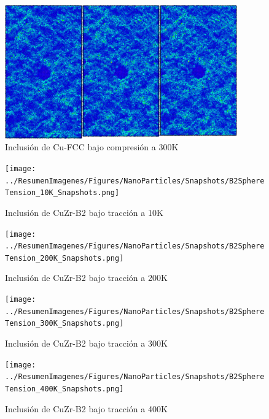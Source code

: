 \begin{figure}[htp]
\centering
\includegraphics[width=10cm]{../ResumenImagenes/Figures/NanoParticles/Snapshots/cuSphereCompression_300K_Snapshots.png}
\caption[Inclusión de Cu-FCC bajo compresión a 300K]{Inclusión de Cu-FCC bajo compresión a 300K}
\label{C4:fg:snapshot_comp_FCC_300K}
\end{figure}

\begin{figure}[htp]
\centering
\texttt{[image: ../ResumenImagenes/Figures/NanoParticles/Snapshots/B2SphereTension\_10K\_Snapshots.png]}
\caption[Inclusión de CuZr-B2 bajo tracción a 10K]{Inclusión de CuZr-B2 bajo tracción a 10K}
\label{C4:fg:snapshot_ten_B2_10K}
\end{figure}

\begin{figure}[htp]
\centering
\texttt{[image: ../ResumenImagenes/Figures/NanoParticles/Snapshots/B2SphereTension\_200K\_Snapshots.png]}
\caption[Inclusión de CuZr-B2 bajo tracción a 200K]{Inclusión de CuZr-B2 bajo tracción a 200K}
\label{C4:fg:snapshot_ten_B2_200K}
\end{figure}

\begin{figure}[htp]
\centering
\texttt{[image: ../ResumenImagenes/Figures/NanoParticles/Snapshots/B2SphereTension\_300K\_Snapshots.png]}
\caption[Inclusión de CuZr-B2 bajo tracción a 300K]{Inclusión de CuZr-B2 bajo tracción a 300K}
\label{C4:fg:snapshot_ten_B2_300K}
\end{figure}

\clearpage

\begin{figure}[htp]
\centering
\texttt{[image: ../ResumenImagenes/Figures/NanoParticles/Snapshots/B2SphereTension\_400K\_Snapshots.png]}
\caption[Inclusión de CuZr-B2 bajo tracción a 400K]{Inclusión de CuZr-B2 bajo tracción a 400K}
\label{C4:fg:snapshot_ten_B2_400K}
\end{figure}

